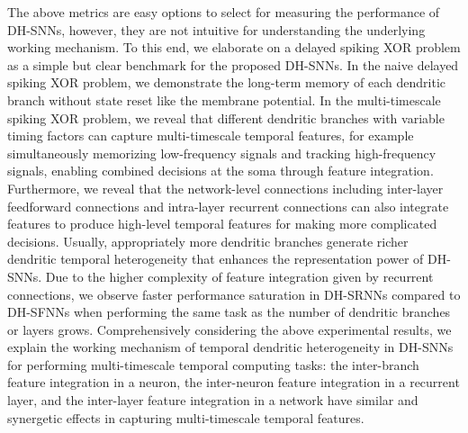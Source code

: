 The above metrics are easy options to select for measuring the performance of DH-SNNs, however, they are not intuitive for understanding the underlying working mechanism. To this end, we elaborate on a delayed spiking XOR problem as a simple but clear benchmark for the proposed DH-SNNs. In the naive delayed spiking XOR problem, we demonstrate the long-term memory of each dendritic branch without state reset like the membrane potential. In the multi-timescale spiking XOR problem, we reveal that different dendritic branches with variable timing factors can capture multi-timescale temporal features, for example simultaneously memorizing low-frequency signals and tracking high-frequency signals, enabling combined decisions at the soma through feature integration. Furthermore, we reveal that the network-level connections including inter-layer feedforward connections and intra-layer recurrent connections can also integrate features to produce high-level temporal features for making more complicated decisions. Usually, appropriately more dendritic branches generate richer dendritic temporal heterogeneity that enhances the representation power of DH-SNNs. Due to the higher complexity of feature integration given by recurrent connections, we observe faster performance saturation in DH-SRNNs compared to DH-SFNNs when performing the same task as the number of dendritic branches or layers grows. Comprehensively considering the above experimental results, we explain the working mechanism of temporal dendritic heterogeneity in DH-SNNs for performing multi-timescale temporal computing tasks: the inter-branch feature integration in a neuron, the inter-neuron feature integration in a recurrent layer, and the inter-layer feature integration in a network have similar and synergetic effects in capturing multi-timescale temporal features.

